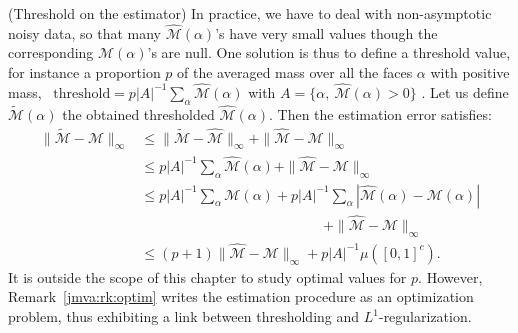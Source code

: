 \begin{remark}{{(\sc Threshold on the estimator})}
\label{jmva:rk:threshold}
In practice, we have to deal with non-asymptotic noisy data, so that many $\widehat{\mathcal{M}}(\alpha)$'s have very small values though the corresponding $\mathcal{M}(\alpha)$'s are null.
One solution is thus to define a threshold value, for instance a proportion $p$ of the averaged mass over all the faces $\alpha$ with positive mass, \ie~$\text{threshold} = p |A|^{-1} \sum_{\alpha} \widehat{\mathcal{M}}(\alpha)$ with $A = \{\alpha,~\widehat{\mathcal{M}}(\alpha) > 0\}$ .
Let us define $\widetilde{\mathcal{M}}(\alpha)$ the obtained thresholded $\widehat{\mathcal{M}}(\alpha)$. Then the estimation error satisfies:
\begin{align*}
\|\widetilde{\mathcal{M}} - \mathcal{M}\|_\infty &\le \| \widetilde{\mathcal{M}} - \widehat{\mathcal{M}} \|_\infty +  \| \widehat{\mathcal{M}} - \mathcal{M}\|_\infty \\
& \le p |A|^{-1} \sum_{\alpha} \widehat{\mathcal{M}}(\alpha) + \| \widehat{\mathcal{M}} - \mathcal{M} \|_\infty \\
& \le p |A|^{-1} \sum_{\alpha} \mathcal{M}(\alpha) + p |A|^{-1} \sum_{\alpha} |  \widehat{\mathcal{M}}(\alpha) - \mathcal{M}(\alpha) | \\&~~~~~~~~~~~~~~~~~~~~~~~~~~~~~~~~~~~~~~~~~~~~~~~~~~~~~~~~~~~+ \| \widehat{\mathcal{M}} - \mathcal{M} \|_\infty \\
& \le (p + 1) \| \widehat{\mathcal{M}} - \mathcal{M} \|_\infty + p |A|^{-1} \mu([0, 1]^c).
\end{align*}
It is outside the scope of this chapter to study optimal values for $p$. However, Remark~\ref{jmva:rk:optim} writes the estimation procedure as an optimization problem, thus exhibiting a link between thresholding and $L^1$-regularization.
\end{remark}

